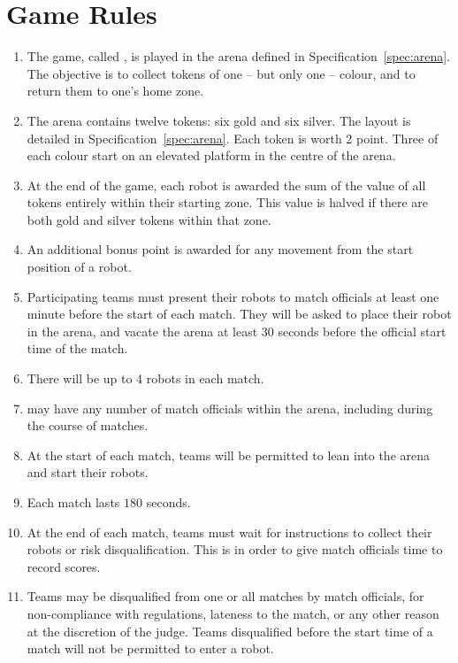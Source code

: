 \section{Game Rules}
\label{sec:rules}

\begin{enumerate}
  \item The game, called \emph{\gamename}, is played in the arena defined in
        Specification~\ref{spec:arena}. The objective is to collect tokens of
        one -- but only one -- colour, and to return them to one's home zone.
  \item The arena contains twelve tokens: six gold and six silver. The layout
        is detailed in Specification~\ref{spec:arena}. Each token is worth 2
        point. Three of each colour start on an elevated platform in the centre
        of the arena.
  \item At the end of the game, each robot is awarded the sum of the value of
        all tokens entirely within their starting zone. This value is halved
        if there are both gold and silver tokens within that zone.
  \item An additional bonus point is awarded for any movement from the start
        position of a robot.
  \item Participating teams must present their robots to match officials at
        least one minute before the start of each match. They will be asked to
        place their robot in the arena, and vacate the arena at least 30 seconds
        before the official start time of the match.
  \item There will be up to 4 robots in each match.
  \item \org may have any number of match officials within the arena, including
        during the course of matches.
  \item At the start of each match, teams will be permitted to lean into the
        arena and start their robots.
  \item Each match lasts $180$ seconds.
  \item At the end of each match, teams must wait for instructions to collect
        their robots or risk disqualification. This is in order to give match
        officials time to record scores.
  \item Teams may be disqualified from one or all matches by match officials,
        for non-compliance with regulations, lateness to the match, or any other
        reason at the discretion of the judge. Teams disqualified before the
        start time of a match will not be permitted to enter a robot.
\end{enumerate}

